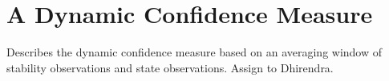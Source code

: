 \section{A Dynamic Confidence Measure}\label{sec:confidence}

Describes the dynamic confidence measure based on an averaging window of stability observations and state observations. Assign to Dhirendra.
